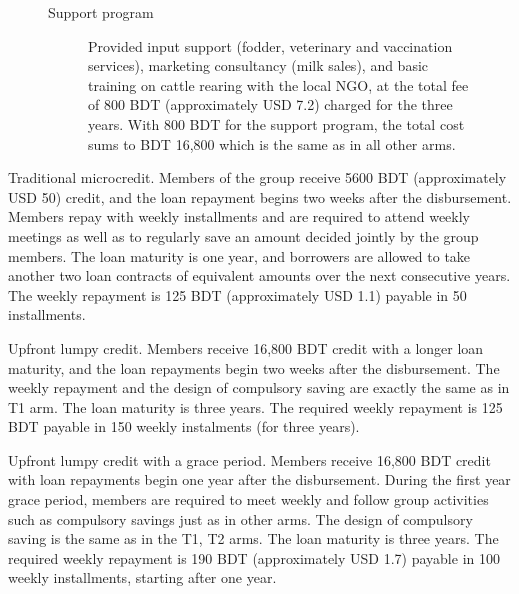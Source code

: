 \begin{figure}
{{\begin{description}
\begin{description}
		\item[Support program] 	Provided input support (fodder, veterinary and vaccination services), marketing consultancy (milk sales), and basic training on cattle rearing with the local NGO, at the total fee of 800 BDT (approximately USD 7.2) charged for the three years. With 800 BDT for the support program, the total cost sums to BDT 16,800 which is the same as in all other arms.
		\end{description}
	\end{description}
	}
}
\end{figure}

	\begin{description}
	\vspace{1.0ex}\setlength{\itemsep}{1.0ex}\setlength{\baselineskip}{12pt}
	\item[T1]	Traditional microcredit. Members of the group receive 5600 BDT (approximately USD 50) credit, and the loan repayment begins two weeks after the disbursement. Members repay with weekly installments and are required to attend weekly meetings as well as to regularly save an amount decided jointly by the group members. The loan maturity is one year, and borrowers are allowed to take another two loan contracts of equivalent amounts over the next consecutive years. The weekly repayment is 125 BDT (approximately USD 1.1) payable in 50 installments.
	\item[T2]	Upfront lumpy credit. Members receive 16,800 BDT credit with a longer loan maturity, and the loan repayments begin two weeks after the disbursement. The weekly repayment and the design of compulsory saving are exactly the same as in \textsf{T1} arm. The loan maturity is three years. The required weekly repayment is 125 BDT payable in 150 weekly instalments (for three years). 
	\item[T3]	Upfront lumpy credit with a grace period. Members receive 16,800 BDT credit with loan repayments begin one year after the disbursement. During the first year grace period, members are required to meet weekly and follow group activities such as compulsory savings just as in other arms. The design of compulsory saving is the same as in the \textsf{T1}, \textsf{T2} arms. The loan maturity is three years. The required weekly repayment is 190 BDT (approximately USD 1.7) payable in 100 weekly installments, starting after one year.

\end{description}
